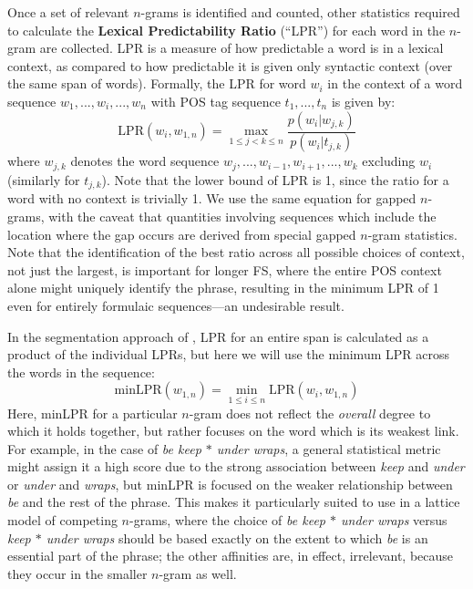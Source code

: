 \documentclass[11pt,letterpaper]{article}
\newcommand{\gap}{$*$\xspace}
\newcommand{\ex}[1]{\textit{#1}\xspace}
\newcommand{\termdef}[1]{\textbf{#1}\xspace}
\newcommand{\LPR}{\ensuremath{\text{LPR}}}
\newcommand{\minLPR}{\ensuremath{\text{minLPR}}}
\begin{document}
Once a set of relevant $n$-grams is identified and counted, other statistics required to calculate the \termdef{Lexical Predictability Ratio} (``LPR'') for each word in the $n$-gram are collected. LPR is a measure of how predictable a word is in a lexical context, as compared to how predictable it is given only syntactic context (over the same span of words). Formally, the LPR for word $w_i$ in the context of a word sequence $w_1,..., w_i, ..., w_{n}$ with POS tag sequence $t_1, ..., t_{n}$ is given by:
\begin{displaymath}
\LPR(w_i,w_{1,n}) = \max_{1 \leq j < k \leq n }{\frac{p(w_i|w_{j,k})}{p(w_i|t_{j,k})}}
\end{displaymath}
where $w_{j,k}$ denotes the word sequence $w_j,..., w_{i-1}, w_{i+1}, ..., w_{k}$ excluding $w_{i}$ (similarly for $t_{j,k}$). Note that the lower bound of LPR is 1, since the ratio for a word with no context is trivially 1. We use the same equation for gapped $n$-grams, with the caveat that quantities involving sequences which include the location where the gap occurs are derived from special gapped $n$-gram statistics. Note that the identification of the best ratio across all possible choices of context, not just the largest, is important for longer FS, where the entire POS context alone might uniquely identify the phrase, resulting in the minimum LPR of 1 even for entirely formulaic sequences---an undesirable result. 


In the segmentation approach of , LPR for an entire span is calculated as a product of the individual LPRs, but here we will use the minimum LPR across the words in the sequence:
\begin{displaymath}
\minLPR(w_{1,n}) = \min_{1 \leq i \leq n }{\LPR(w_i,w_{1,n})}
\end{displaymath}
Here, minLPR for a particular $n$-gram does not reflect the \emph{overall} degree to which it holds together, but rather focuses on the word which is its weakest link. For example, in the case of \ex{be keep \gap under wraps}, a general statistical metric might assign it a high score due to the strong association between \ex{keep} and \ex{under} or \ex{under} and \ex{wraps}, but minLPR is focused on the weaker relationship between \ex{be} and the rest of the phrase. This makes it particularly suited to use in a lattice model of competing $n$-grams, where the choice of \ex{be keep \gap under wraps} versus \ex{keep \gap under wraps} should be based exactly on the extent to which \ex{be} is an essential part of the phrase; the other affinities are, in effect, irrelevant, because they occur in the smaller $n$-gram as well.  
\end{document}

